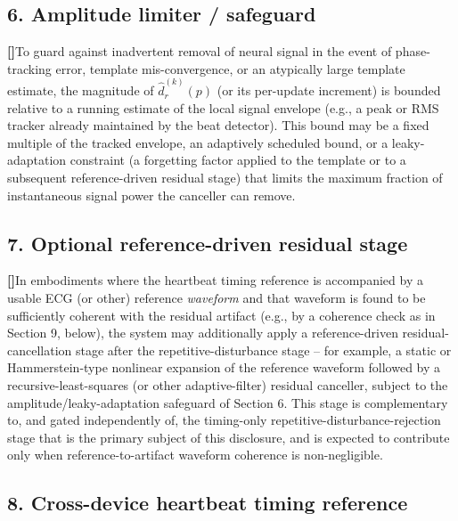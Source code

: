 \documentclass[12pt]{article}
\newcounter{para}
\newcommand{\parnum}{\stepcounter{para}\noindent\textbf{[\thepara]}\quad}
\begin{document}
\subsection*{6. Amplitude limiter / safeguard}

\parnum To guard against inadvertent removal of neural signal in the event of phase-tracking error, template mis-convergence, or an atypically large template estimate, the magnitude of $\hat d_r^{(k)}(p)$ (or its per-update increment) is bounded relative to a running estimate of the local signal envelope (e.g., a peak or RMS tracker already maintained by the beat detector). This bound may be a fixed multiple of the tracked envelope, an adaptively scheduled bound, or a leaky-adaptation constraint (a forgetting factor applied to the template or to a subsequent reference-driven residual stage) that limits the maximum fraction of instantaneous signal power the canceller can remove.

\subsection*{7. Optional reference-driven residual stage}

\parnum In embodiments where the heartbeat timing reference is accompanied by a usable ECG (or other) reference \emph{waveform} and that waveform is found to be sufficiently coherent with the residual artifact (e.g., by a coherence check as in Section 9, below), the system may additionally apply a reference-driven residual-cancellation stage after the repetitive-disturbance stage -- for example, a static or Hammerstein-type nonlinear expansion of the reference waveform followed by a recursive-least-squares (or other adaptive-filter) residual canceller, subject to the amplitude/leaky-adaptation safeguard of Section 6. This stage is complementary to, and gated independently of, the timing-only repetitive-disturbance-rejection stage that is the primary subject of this disclosure, and is expected to contribute only when reference-to-artifact waveform coherence is non-negligible.

\subsection*{8. Cross-device heartbeat timing reference}
\end{document}
